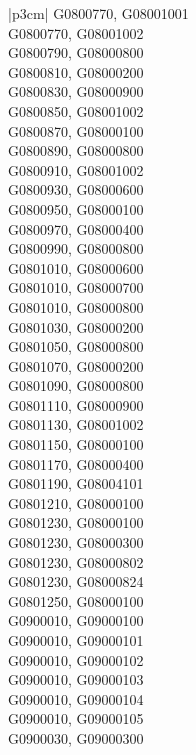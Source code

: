\begin{customLongTable}{ |p{3cm}| }
G0800770, G08001001 \\ \hline
G0800770, G08001002 \\ \hline
G0800790, G08000800 \\ \hline
G0800810, G08000200 \\ \hline
G0800830, G08000900 \\ \hline
G0800850, G08001002 \\ \hline
G0800870, G08000100 \\ \hline
G0800890, G08000800 \\ \hline
G0800910, G08001002 \\ \hline
G0800930, G08000600 \\ \hline
G0800950, G08000100 \\ \hline
G0800970, G08000400 \\ \hline
G0800990, G08000800 \\ \hline
G0801010, G08000600 \\ \hline
G0801010, G08000700 \\ \hline
G0801010, G08000800 \\ \hline
G0801030, G08000200 \\ \hline
G0801050, G08000800 \\ \hline
G0801070, G08000200 \\ \hline
G0801090, G08000800 \\ \hline
G0801110, G08000900 \\ \hline
G0801130, G08001002 \\ \hline
G0801150, G08000100 \\ \hline
G0801170, G08000400 \\ \hline
G0801190, G08004101 \\ \hline
G0801210, G08000100 \\ \hline
G0801230, G08000100 \\ \hline
G0801230, G08000300 \\ \hline
G0801230, G08000802 \\ \hline
G0801230, G08000824 \\ \hline
G0801250, G08000100 \\ \hline
G0900010, G09000100 \\ \hline
G0900010, G09000101 \\ \hline
G0900010, G09000102 \\ \hline
G0900010, G09000103 \\ \hline
G0900010, G09000104 \\ \hline
G0900010, G09000105 \\ \hline
G0900030, G09000300 \\ \hline

\end{customLongTable}
